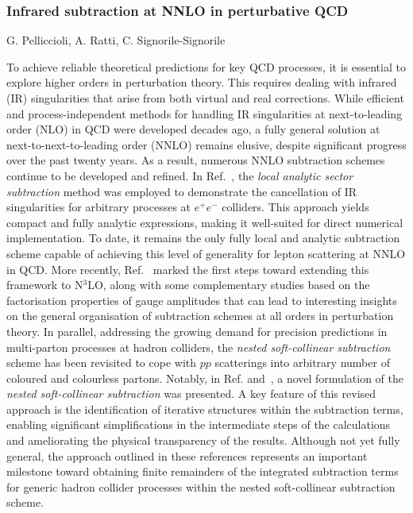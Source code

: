 \documentclass{FBR_Bericht_2025}
\begin{document}
\begin{refsection}
\subsubsection{Infrared subtraction at NNLO in perturbative QCD}
\begin{Namen}
G. Pelliccioli, A. Ratti, C. Signorile-Signorile
\end{Namen}
%
To achieve reliable theoretical predictions for key QCD processes, it is essential to explore higher orders in perturbation theory. This requires dealing with infrared (IR) singularities that arise from both virtual and real corrections. While efficient and process-independent methods for handling IR singularities at next-to-leading order (NLO) in QCD were developed decades ago, a fully general solution at next-to-next-to-leading order (NNLO) remains elusive, despite significant progress over the past twenty years.
As a result, numerous NNLO subtraction schemes continue to be developed and refined. In Ref.~\cite{Bertolotti:2022aih}, the \emph{local analytic sector subtraction} method was employed to demonstrate the cancellation of IR singularities for arbitrary processes at $e^+e^-$ colliders. This approach yields compact and fully analytic expressions, making it well-suited for direct numerical implementation. To date, it remains the only fully local and analytic subtraction scheme capable of achieving this level of generality for lepton scattering at NNLO in QCD.
More recently, Ref.~\cite{Magnea:2024jqg} marked the first steps toward extending this framework to N${}^3$LO, along with some complementary studies based on the factorisation properties of gauge amplitudes that can lead to interesting insights on the general organisation of subtraction schemes at all orders in perturbation theory.
In parallel, addressing the growing demand for precision predictions in multi-parton processes at hadron colliders, the \emph{nested soft-collinear subtraction} scheme has been revisited to cope with $pp$ scatterings into arbitrary number of coloured and colourless partons. Notably, in Ref.\cite{Devoto:2023rpv} and~\cite{Devoto:2025kin}, 
a novel formulation of the \emph{nested soft-collinear subtraction} was presented. 
A key feature of this revised approach is the identification of iterative structures within the subtraction terms,
enabling significant simplifications in the intermediate steps of the calculations and ameliorating the physical transparency of the results. 
Although not yet fully general, the approach outlined in these references represents an important milestone toward obtaining finite remainders of the integrated subtraction terms for generic hadron collider processes within the nested soft-collinear subtraction scheme.



\end{refsection}
\end{document}
